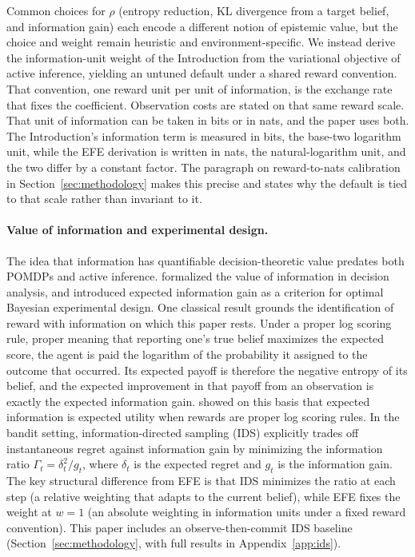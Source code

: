 Common choices for $\rho$ (entropy reduction, KL divergence from a target belief, and information gain) each encode a different notion of epistemic value, but the choice and weight remain heuristic and environment-specific. We instead derive the information-unit weight of the Introduction from the variational objective of active inference, yielding an untuned default under a shared reward convention. That convention, one reward unit per unit of information, is the exchange rate that fixes the coefficient. Observation costs are stated on that same reward scale. That unit of information can be taken in bits or in nats, and the paper uses both. The Introduction's information term is measured in bits, the base-two logarithm unit, while the EFE derivation is written in nats, the natural-logarithm unit, and the two differ by a constant factor. The paragraph on reward-to-nats calibration in Section~\ref{sec:methodology} makes this precise and states why the default is tied to that scale rather than invariant to it.

\paragraph{Value of information and experimental design.}
The idea that information has quantifiable decision-theoretic value predates both POMDPs and active inference. \citet{howard1966} formalized the value of information in decision analysis, and \citet{lindley1956} introduced expected information gain as a criterion for optimal Bayesian experimental design. One classical result grounds the identification of reward with information on which this paper rests. Under a proper log scoring rule, proper meaning that reporting one's true belief maximizes the expected score, the agent is paid the logarithm of the probability it assigned to the outcome that occurred. Its expected payoff is therefore the negative entropy of its belief, and the expected improvement in that payoff from an observation is exactly the expected information gain. \citet{bernardo1979} showed on this basis that expected information is expected utility when rewards are proper log scoring rules. In the bandit setting, information-directed sampling (IDS) \citep{russo2014} explicitly trades off instantaneous regret against information gain by minimizing the information ratio $\Gamma_t = \delta_t^2 / g_t$, where $\delta_t$ is the expected regret and $g_t$ is the information gain. The key structural difference from EFE is that IDS minimizes the ratio at each step (a relative weighting that adapts to the current belief), while EFE fixes the weight at $w{=}1$ (an absolute weighting in information units under a fixed reward convention). This paper includes an observe-then-commit IDS baseline (Section~\ref{sec:methodology}, with full results in Appendix~\ref{app:ids}).

